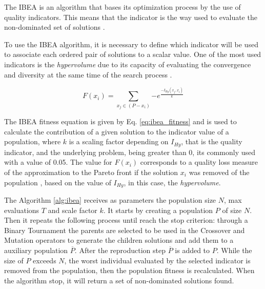 The IBEA is an algorithm that bases its optimization process by the use of quality indicators. This means that the indicator is the way used to evaluate the non-dominated set of solutions \cite{figueiredo2013algoritmo}.


To use the IBEA algorithm, it is necessary to define which indicator will be used to associate each ordered pair of solutions to a scalar value. One of the most used indicators is the \textit{hypervolume} due to its capacity of evaluating the convergence and diversity at the same time of the search process \cite{ishibuchi2008evolutionary}.


\begin{equation} \label{eq:ibea_fitness}
	F(x_i) = \sum_{x_j \in (P-x_i)} {-e^\frac{-I_{Hy}(x_j,x_i)}{k}}
\end{equation}


The IBEA fitness equation is given by Eq. \ref{eq:ibea_fitness} and is used to calculate the contribution of a given solution to the indicator value of a population, where $k$ is a scaling factor depending on $I_{Hy}$, that is the quality indicator, and the underlying problem, being greater than 0, its commonly used with a value of 0.05. The value for $F(x_i)$ corresponds to a quality loss measure of the approximation to the Pareto front if the solution $x_i$ was removed of the population \cite{figueiredo2013algoritmo}, based on the value of $I_{Hy}$, in this case, the \textit{hypervolume}.


The Algorithm \ref{alg:ibea} receives as parameters the population size $N$, max evaluations $T$ and scale factor $k$. It starts by creating a population $P$ of size $N$. Then it repeats the following process until reach the stop criterion: through a Binary Tournament the parents are selected to be used in the Crossover and Mutation operators to generate the children solutions and add them to a auxiliary population $\overline P$. After the reproduction step $\overline P$ is added to $P$. While the size of $P$ exceeds $N$, the worst individual evaluated by the selected indicator is removed from the population, then the population fitness is recalculated. When the algorithm stop, it will return a set of non-dominated solutions found.


